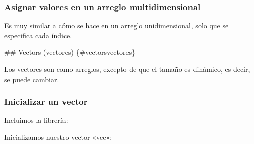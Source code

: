 \documentclass[letterpaper,10pt,spanish]{sphinxmanual}
\begin{document}
\begin{sphinxVerbatim}[commandchars=\\\{\},numbers=left,firstnumber=1,stepnumber=1]
     \PYG{p}{[}\PYG{p}{]}\PYG{p}{[}\PYG{p}{]}
     \PYG{p}{[}\PYG{p}{]}\PYG{p}{[}\PYG{p}{]}\PYG{p}{[}\PYG{p}{]}
\end{sphinxVerbatim}


\subsubsection{Asignar valores en un arreglo multidimensional}
\label{\detokenize{edd/lineales:asignar-valores-en-un-arreglo-multidimensional}}
Es muy similar a cómo se hace en un arreglo unidimensional, solo que se especifica cada índice.

\begin{sphinxVerbatim}[commandchars=\\\{\},numbers=left,firstnumber=1,stepnumber=1]
          
    \PYG{p}{[}\PYG{p}{]}\PYG{p}{[}\PYG{p}{]}  
    \PYG{p}{[}\PYG{p}{]}\PYG{p}{[}\PYG{p}{]}  
\end{sphinxVerbatim}

\#\# Vectors (vectores) \{\#vectors\textendash{}vectores\}

Los vectores son como arreglos, excepto de que el tamaño es dinámico, es decir, se puede cambiar.


\subsubsection{Inicializar un vector}
\label{\detokenize{edd/lineales:inicializar-un-vector}}
Incluimos la librería:

\begin{sphinxVerbatim}[commandchars=\\\{\},numbers=left,firstnumber=1,stepnumber=1]
     
\end{sphinxVerbatim}

Inicializamos nuestro vector «vec»:
\end{document}
